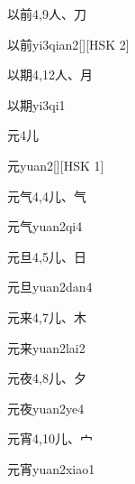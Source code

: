 \begin{entry}{以前}{4,9}{⼈、⼑}
  \begin{phonetics}{以前}{yi3qian2}[][HSK 2]
  \end{phonetics}
\end{entry}

\begin{entry}{以期}{4,12}{⼈、⽉}
  \begin{phonetics}{以期}{yi3qi1}
  \end{phonetics}
\end{entry}

\begin{entry}{元}{4}{⼉}
  \begin{phonetics}{元}{yuan2}[][HSK 1]
  \end{phonetics}
\end{entry}

\begin{entry}{元气}{4,4}{⼉、⽓}
  \begin{phonetics}{元气}{yuan2qi4}
  \end{phonetics}
\end{entry}

\begin{entry}{元旦}{4,5}{⼉、⽇}
  \begin{phonetics}{元旦}{yuan2dan4}
  \end{phonetics}
\end{entry}

\begin{entry}{元来}{4,7}{⼉、⽊}
  \begin{phonetics}{元来}{yuan2lai2}
  \end{phonetics}
\end{entry}

\begin{entry}{元夜}{4,8}{⼉、⼣}
  \begin{phonetics}{元夜}{yuan2ye4}
  \end{phonetics}
\end{entry}

\begin{entry}{元宵}{4,10}{⼉、⼧}
  \begin{phonetics}{元宵}{yuan2xiao1}
  \end{phonetics}
\end{entry}


